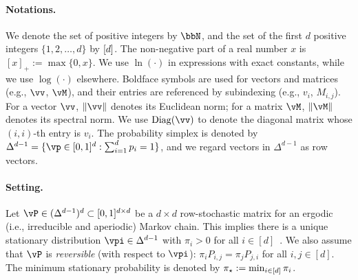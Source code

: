 \paragraph{Notations.}
%
We denote the set of positive integers by $\bbN$, and
the set of the first $d$ positive integers $\{1,2,\dotsc,d\}$ by $[d]$.
The non-negative part of a real number $x$ is $[x]_+ := \max\{0,x\}$.
We use $\ln(\cdot)$ in expressions with exact constants, while we use $\log(\cdot)$ elsewhere.
Boldface symbols are used for vectors and matrices (e.g., $\vv$,
$\vM$), and their entries are referenced by subindexing (e.g., $v_i$,
$M_{i,j}$).
For a vector $\vv$, $\norm{\vv}$ denotes its Euclidean norm; for a
matrix $\vM$, $\norm{\vM}$ denotes its spectral norm.
We use $\Diag(\vv)$ to denote the diagonal matrix whose $(i,i)$-th
entry is $v_i$.
The probability simplex is denoted by $\Delta^{d-1} = \{ \vp
\in [0,1]^d : \sum_{i=1}^d p_i = 1 \}$, and we regard vectors in
$\Delta^{d-1}$ as row vectors.

\paragraph{Setting.}
%
Let $\vP \in (\Delta^{d-1})^d \subset [0,1]^{d \times d}$ be a $d
\times d$ row-stochastic matrix for an ergodic (i.e., irreducible and
aperiodic) Markov chain.
This implies there is a unique stationary distribution $\vpi \in
\Delta^{d-1}$ with $\pi_i > 0$ for all $i \in [d]$~\citep[Corollary
1.17]{LePeWi08}.
We also assume that $\vP$ is \emph{reversible} (with respect to
$\vpi$):
$\pi_i P_{i,j} = \pi_j P_{j,i}$ for all $i,j \in [d]$.
The minimum stationary probability is denoted by $\pi_{\star} := \min_{i
\in [d]} \pi_i$.

